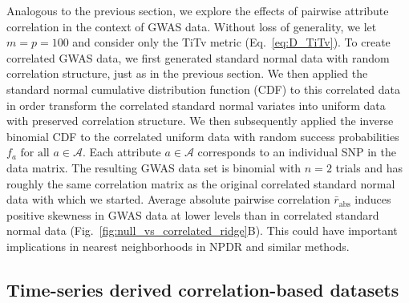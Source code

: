 \documentclass[aos]{imsart}
\begin{document}
Analogous to the previous section, we explore the effects of pairwise attribute correlation in the context of GWAS data. Without loss of generality, we let $m=p=100$ and consider only the TiTv metric (Eq.~\ref{eq:D_TiTv}). To create correlated GWAS data, we first generated standard normal data with random correlation structure, just as in the previous section. We then applied the standard normal cumulative distribution function (CDF) to this correlated data in order transform the correlated standard normal variates into uniform data with preserved correlation structure. We then subsequently applied the inverse binomial CDF to the correlated uniform data with random success probabilities $f_a \text{ for all } a \in \mathcal{A}$. Each attribute $a \in \mathcal{A}$ corresponds to an individual SNP in the data matrix. The resulting GWAS data set is binomial with $n=2$ trials and has roughly the same correlation matrix as the original correlated standard normal data with which we started. Average absolute pairwise correlation $\bar{r}_\text{abs}$ induces positive skewness in GWAS data at lower levels than in correlated standard normal data (Fig.~\ref{fig:null_vs_correlated_ridge}B). This could have important implications in nearest neighborhoods in NPDR and similar methods.
%

\subsection{Time-series derived correlation-based datasets}
\end{document}

